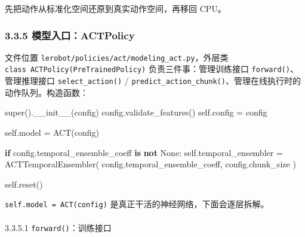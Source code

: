 \documentclass[
  chinese,
]{ctexart}
\makeatletter
\let\oldparagraph\paragraph
\renewcommand{\paragraph}{
    \@ifstar
      \xxxParagraphStar
      \xxxParagraphNoStar
  }
\newcommand{\xxxParagraphStar}[1]{\oldparagraph*{#1}\mbox{}}
\newcommand{\xxxParagraphNoStar}[1]{\oldparagraph{#1}\mbox{}}
\newenvironment{Shaded}{\begin{snugshade}}{\end{snugshade}}
\newcommand{\BuiltInTok}[1]{\textcolor[rgb]{0.00,0.23,0.31}{#1}}
\newcommand{\ControlFlowTok}[1]{\textcolor[rgb]{0.00,0.23,0.31}{\textbf{#1}}}
\newcommand{\FunctionTok}[1]{\textcolor[rgb]{0.28,0.35,0.67}{#1}}
\newcommand{\KeywordTok}[1]{\textcolor[rgb]{0.00,0.23,0.31}{\textbf{#1}}}
\newcommand{\NormalTok}[1]{\textcolor[rgb]{0.00,0.23,0.31}{#1}}
\newcommand{\OperatorTok}[1]{\textcolor[rgb]{0.37,0.37,0.37}{#1}}
\newcommand{\VariableTok}[1]{\textcolor[rgb]{0.07,0.07,0.07}{#1}}
\makeatother
\begin{document}
先把动作从标准化空间还原到真实动作空间，再移回 CPU。

\subsubsection{3.3.5
模型入口：ACTPolicy}\label{ux6a21ux578bux5165ux53e3actpolicy}

文件位置 \texttt{lerobot/policies/act/modeling\_act.py}，外层类
\texttt{class\ ACTPolicy(PreTrainedPolicy)} 负责三件事：管理训练接口
\texttt{forward()}、管理推理接口 \texttt{select\_action()} /
\texttt{predict\_action\_chunk()}、管理在线执行时的动作队列。构造函数：

\begin{Shaded}
\begin{Highlighting}[]
\BuiltInTok{super}\NormalTok{().}\FunctionTok{\_\_init\_\_}\NormalTok{(config)}
\NormalTok{config.validate\_features()}
\VariableTok{self}\NormalTok{.config }\OperatorTok{=}\NormalTok{ config}

\VariableTok{self}\NormalTok{.model }\OperatorTok{=}\NormalTok{ ACT(config)}

\ControlFlowTok{if}\NormalTok{ config.temporal\_ensemble\_coeff }\KeywordTok{is} \KeywordTok{not} \VariableTok{None}\NormalTok{:}
    \VariableTok{self}\NormalTok{.temporal\_ensembler }\OperatorTok{=}\NormalTok{ ACTTemporalEnsembler(}
\NormalTok{        config.temporal\_ensemble\_coeff, config.chunk\_size}
\NormalTok{    )}

\VariableTok{self}\NormalTok{.reset()}
\end{Highlighting}
\end{Shaded}

\texttt{self.model\ =\ ACT(config)}
是真正干活的神经网络，下面会逐层拆解。

\paragraph{\texorpdfstring{3.3.5.1
\texttt{forward()}：训练接口}{3.3.5.1 forward()：训练接口}}\label{forwardux8badux7ec3ux63a5ux53e3}
\end{document}
